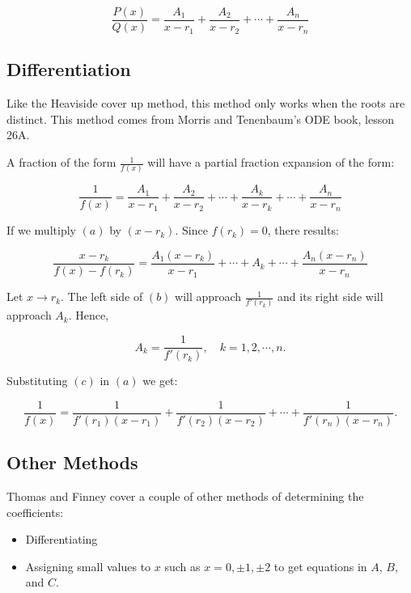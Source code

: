\documentclass{article}
\begin{document}
\[ \frac{P(x)}{Q(x)} = \frac{A_1}{x-r_1} + \frac{A_2}{x-r_2} + \cdots + \frac{A_n}{x-r_n} \]

\subsection{Differentiation}
Like the Heaviside cover up method, this method only works when the roots are distinct. This method comes from Morris and Tenenbaum's ODE book, lesson 26A.

A fraction of the form $\frac{1}{f(x)}$ will have a partial fraction expansion of the form:

\[ \tag{a} \frac{1}{f(x)} = \frac{A_1}{x - r_1} + \frac{A_2}{x - r_2} + \cdots + \frac{A_k}{x - r_k} + \cdots + \frac{A_n}{x - r_n } \]

If we multiply $(a)$ by $(x - r_k)$. Since $f(r_k) = 0$, there results:

\[ \tag{b} \frac{x - r_k}{f(x) - f(r_k)} = \frac{A_1(x - r_k)}{x - r_1} + \cdots + A_k + \cdots + \frac{A_n(x - r_n)}{x - r_n} \]

Let $x \longrightarrow r_k$. The left side of $(b)$ will approach $\frac{1}{f'(r_k)}$ and its right side will approach $A_k$. Hence,

\[ \tag{c} A_k = \frac{1}{f'(r_k)}, \quad k = 1,2,\cdots,n. \]

Substituting $(c)$ in $(a)$ we get:

\[ \tag{d} \frac{1}{f(x)} = \frac{1}{f'(r_1)(x - r_1)} + \frac{1}{f'(r_2)(x - r_2)} + \cdots + \frac{1}{f'(r_n)(x - r_n)}. \]

\subsection{Other Methods}
Thomas and Finney cover a couple of other methods of determining the coefficients:

\begin{itemize}
\item Differentiating
\item Assigning small values to $x$ such as $x=0,\pm1,\pm2$ to get equations in $A$, $B$, and $C$.
\end{itemize}
\end{document}
